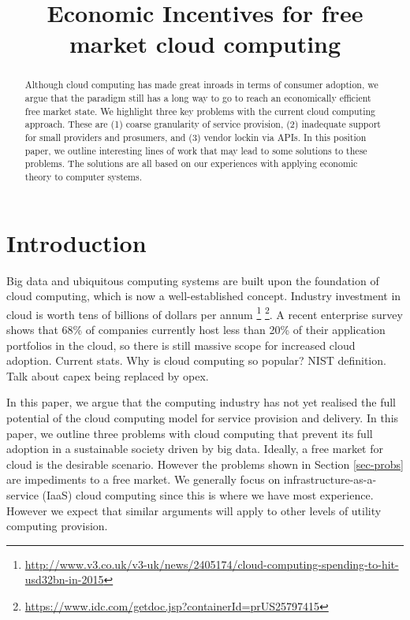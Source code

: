 \documentclass[conference,10pt]{IEEEtran}
\begin{document}
\title{Economic Incentives for free market cloud computing}


\author{
}

\maketitle


\begin{abstract}
Although cloud computing has made great inroads in terms of consumer adoption, we argue that the paradigm still has a long way to go to reach an economically efficient free market state.
We highlight three key problems with the current cloud computing approach. These are (1) coarse granularity of service provision, (2) inadequate support for small providers and prosumers, and (3) vendor lockin via APIs.
In this position paper, we outline interesting lines of work that may lead to some solutions to these problems. The solutions are all based on our experiences with applying economic theory to computer systems.
\end{abstract}


\section{Introduction}
\label{sec-intro}

Big data and ubiquitous computing systems are built upon the foundation of cloud computing, which is now a well-established concept. Industry investment in cloud is worth tens of billions of dollars per annum \footnote{
\url{http://www.v3.co.uk/v3-uk/news/2405174/cloud-computing-spending-to-hit-usd32bn-in-2015}} \footnote{\url{https://www.idc.com/getdoc.jsp?containerId=prUS25797415}}. 
A recent enterprise survey shows that 68\% of companies currently host less than 20\% of their application portfolios in the cloud, so there is still massive scope for increased cloud adoption.
Current stats. Why is cloud computing so popular? NIST definition. Talk about capex being replaced by opex.

In this paper, we argue that the computing industry has not yet realised the full potential of the cloud computing model for service provision and delivery. In this paper, we outline three problems with cloud computing that prevent its full adoption in a sustainable society driven by big data.
Ideally, a free market for cloud is the desirable scenario. However the problems shown in Section \ref{sec-probs}
are impediments to a free market.
We generally focus on infrastructure-as-a-service (IaaS) cloud computing since this is where we have most experience. However we expect that similar arguments will apply to other levels of utility computing provision.
\end{document}
